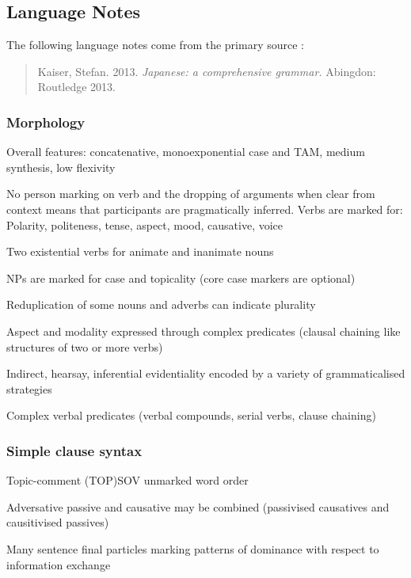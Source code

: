 \documentclass[a4paper, 11pt]{book}
\begin{document}
\subsection{Language Notes}

The following language notes come from the primary source \citep{kaiser2013japanese}:

\begin{quote}
Kaiser, Stefan. 2013. \textit{Japanese: a comprehensive grammar.} Abingdon: Routledge 2013.
\end{quote}

\subsubsection*{Morphology}
\begin{itemize*}
\item Overall features: concatenative, monoexponential case and TAM, medium synthesis, low flexivity
\item No person marking on verb and the dropping of arguments when clear from context means that participants are pragmatically inferred. 
Verbs are marked for: Polarity, politeness, tense, aspect, mood, causative, voice
\item Two existential verbs for animate and inanimate nouns
\item NPs are marked for case and topicality (core case markers are optional)
\item Reduplication of some nouns and adverbs can indicate plurality
\item Aspect and modality expressed through complex predicates (clausal chaining like structures of two or more verbs)
\item Indirect, hearsay, inferential evidentiality encoded by a variety of grammaticalised strategies
\item Complex verbal predicates (verbal compounds, serial verbs, clause chaining)
\end{itemize*}

\subsubsection*{Simple clause syntax}
\begin{itemize*}
\item Topic-comment (TOP)SOV unmarked word order
\item Adversative passive and causative may be combined (passivised causatives and causitivised passives)
\item Many sentence final particles marking patterns of dominance with respect to information exchange
\end{itemize*}
\end{document}
